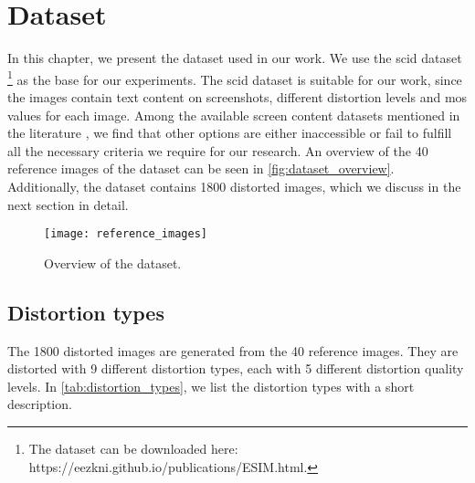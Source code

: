 \chapter{Dataset}
\label{chap:dataset}
In this chapter, we present the dataset used in our work.
We use the \gls{scid} dataset \cite{ni_esim_2017}\footnote{The dataset can be downloaded here: https://eezkni.github.io/publications/ESIM.html.} as the base for our experiments.
The \gls{scid} dataset is suitable for our work, since the images contain text content on screenshots, different distortion levels and \gls{mos} values for each image.
Among the available screen content datasets mentioned in the literature \cite{iqa_survey_2020}, we find that other options are either inaccessible or fail to fulfill all the necessary criteria we require for our research.
An overview of the 40 reference images of the dataset can be seen in \autoref{fig:dataset_overview}.
Additionally, the dataset contains 1800 distorted images, which we discuss in the next section in detail.

\begin{figure}[h!]
    \centering
    \texttt{[image: reference\_images]}
    \caption{Overview of the dataset.}
    \label{fig:dataset_overview}
\end{figure}


\section{Distortion types}
\label{sec:dataset_distortion_types}


The 1800 distorted images are generated from the 40 reference images.
They are distorted with 9 different distortion types, each with 5 different distortion quality levels.
In \autoref{tab:distortion_types}, we list the distortion types with a short description.


